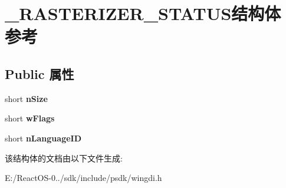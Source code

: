 \hypertarget{struct___r_a_s_t_e_r_i_z_e_r___s_t_a_t_u_s}{}\section{\+\_\+\+R\+A\+S\+T\+E\+R\+I\+Z\+E\+R\+\_\+\+S\+T\+A\+T\+U\+S结构体 参考}
\label{struct___r_a_s_t_e_r_i_z_e_r___s_t_a_t_u_s}
\subsection*{Public 属性}
\begin{DoxyCompactItemize}
\item 
\mbox{\label{struct___r_a_s_t_e_r_i_z_e_r___s_t_a_t_u_s_a15a1eef7aa421d9443eac9d0cb725b9b}} 
short {\bfseries n\+Size}
\item 
\mbox{\label{struct___r_a_s_t_e_r_i_z_e_r___s_t_a_t_u_s_ad61d85920c23f877a615ade17e5201b4}} 
short {\bfseries w\+Flags}
\item 
\mbox{\label{struct___r_a_s_t_e_r_i_z_e_r___s_t_a_t_u_s_afa11cda2644054ec1a70090884ca00b2}} 
short {\bfseries n\+Language\+ID}
\end{DoxyCompactItemize}


该结构体的文档由以下文件生成\+:\begin{DoxyCompactItemize}
\item 
E\+:/\+React\+O\+S-\/0../sdk/include/psdk/wingdi.\+h\end{DoxyCompactItemize}
